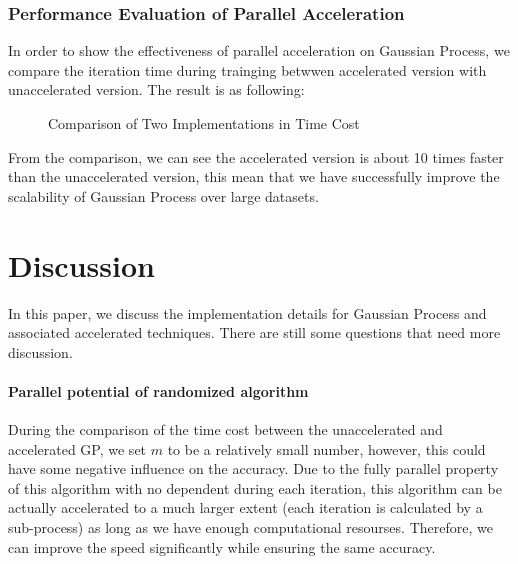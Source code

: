 \documentclass{article}
\begin{document}
\subsubsection{Performance Evaluation of Parallel Acceleration}
In order to show the effectiveness of parallel acceleration on Gaussian Process, we compare the iteration time during trainging betwwen accelerated version with unaccelerated version. The result is as following:
\begin{figure}[H]
	\centering
	\caption{Comparison of Two Implementations in Time Cost}
	\label{fig10}
\end{figure}
From the comparison, we can see the accelerated version is about 10 times faster than the unaccelerated version, this mean that we have successfully improve the scalability of Gaussian Process over large datasets.


\section{Discussion}
In this paper, we discuss the implementation details for Gaussian Process and associated accelerated techniques. There are still some questions that need more discussion.
\paragraph{Parallel potential of randomized algorithm} During the comparison of the time cost between the unaccelerated and accelerated GP, we set $m$ to be a relatively small number, however, this could have some negative influence on the accuracy. Due to the fully parallel property of this algorithm with no dependent during each iteration, this algorithm can be actually accelerated to a much larger extent (each iteration is calculated by a sub-process) as long as we have enough computational resourses. Therefore, we can improve the speed significantly while ensuring the same accuracy.
\end{document}
